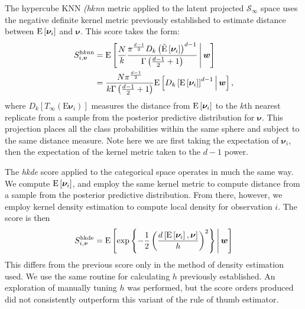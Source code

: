 The hypercube KNN \emph{(h$k$nn} metric applied to the latent projected 
    $\mathcal{S}_{\infty}$ space uses the negative definite kernel metric 
    previously established to estimate distance between $\text{E}\left[\bm{\nu}_i\right]$ 
    and $\bm{\nu}$.  This score takes the form:
    \begin{equation}
      \label{score:cat_hknn}
      \begin{aligned}
      S_{i,\bm{v}}^{\text{h$k$nn}} &= \text{E}\left[\frac{N}{k}
        \frac{\pi^{\frac{d-1}{2}}D_{k}
        \left(\tilde{\text{E}}\left[\bm{\nu}_i\right]\right)^{d-1}}{
          \Gamma\left(\frac{d-1}{2} + 1\right)}
      \,\middle\vert\,\bm{w}\right]\\
      &= \frac{N\pi^{\frac{d-1}{2}}}{k\Gamma\left(\frac{d-1}{2} + 1\right)}
      \text{E}\left[D_{k}\left[\text{E}\left[\bm{\nu}_i\right]\right]^{d-1}\,\middle\vert\,\bm{w}\right],
      \end{aligned}
    \end{equation}
    where $D_{k}\left[T_{\infty}(\text{E}\bm{\nu}_i)\right]$ measures the 
    distance from $\text{E}\left[\bm{\nu}_i\right]$ to the $k$th nearest replicate from 
    a sample from the posterior predictive distribution for $\bm{\nu}$.  This 
    projection places all the class probabilities within the same sphere and 
    subject to the same distance measure.  Note here we are first taking the 
    expectation of $\bm{\nu}_i$, then the expectation of the kernel metric taken 
    to the $d-1$ power.

The \emph{hkde} score applied to the categorical space operates in much the 
    same way.  We compute $\text{E}\left[\bm{\nu}_i\right]$, and employ the same kernel 
    metric to compute distance from a sample from the posterior predictive 
    distribution.  From there, however, we employ kernel density estimation
    to compute local density for observation $i$.  The score is then
    \begin{equation}
        \label{score:cat_hkde}
        S_{i,\bm{v}}^{\text{hkde}} = \text{E}\left[
            \exp\left\lbrace
            -\frac{1}{2}\left(
            \frac{d\left[\text{E}\left[\bm{\nu}_i\right], \bm{\nu}\right]}{h}
            \right)^2
            \right\rbrace 
        \,\middle\vert\, \bm{w}\right]
    \end{equation}
This differs from the previous score only in the method of density estimation 
    used.  We use the same routine for calculating $h$ previously established.  
    An exploration of manually tuning $h$ was performed, but the score orders 
    produced did not consistently outperform this variant of the rule of thumb 
    estimator.

